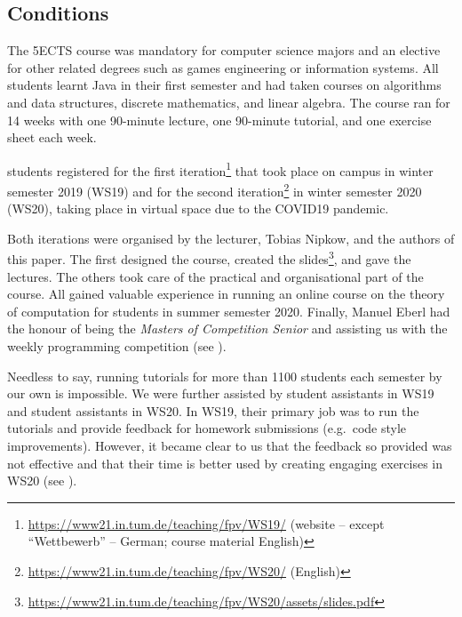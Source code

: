 \subsection{Conditions}

The 5ECTS course was mandatory for computer science majors and
an elective for other related degrees such as games engineering or information systems.
All students learnt Java in their first semester and had taken courses on algorithms and data structures,
discrete mathematics, and linear algebra.
The course ran for 14 weeks with
one 90-minute lecture,
one 90-minute tutorial,
and one exercise sheet each week.

 students registered for
the first iteration\footnote{\url{https://www21.in.tum.de/teaching/fpv/WS19/} (website -- except ``Wettbewerb'' -- German; course material English)} that took place on campus in winter semester 2019 (WS19) and
 for the second iteration\footnote{\url{https://www21.in.tum.de/teaching/fpv/WS20/} (English)} in winter semester 2020 (WS20), taking place in virtual space due to the COVID19 pandemic.

Both iterations were organised by the lecturer, Tobias Nipkow, and the authors of this paper.
The first designed the course, created the slides\footnote{\url{https://www21.in.tum.de/teaching/fpv/WS20/assets/slides.pdf}}, and gave the lectures.
The others took care of the practical and organisational part of the course.
All gained valuable experience in running an online course on the theory of computation for 
students in summer semester 2020.
Finally, Manuel Eberl had the honour of being the \emph{Masters of Competition Senior} and assisting us with the weekly programming competition (see ).

Needless to say,
running tutorials for more than 1100
students each semester by our own is impossible.
We were further assisted by
 student assistants in WS19 and
 student assistants in WS20.
In WS19, their primary job was to run the tutorials and provide feedback for homework submissions (e.g.\ code style improvements).
However, it became clear to us
that the feedback so provided was not effective
and that their time is better used by creating engaging exercises in WS20 (see ).



